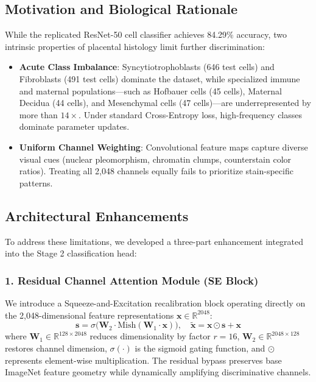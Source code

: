 \documentclass[a4paper,fleqn]{cas-sc}
\begin{document}
\subsection{Motivation and Biological Rationale}
While the replicated ResNet-50 cell classifier achieves 84.29\% accuracy, two intrinsic properties of placental histology limit further discrimination:
\begin{itemize}
    \item \textbf{Acute Class Imbalance}: Syncytiotrophoblasts (646 test cells) and Fibroblasts (491 test cells) dominate the dataset, while specialized immune and maternal populations—such as Hofbauer cells (45 cells), Maternal Decidua (44 cells), and Mesenchymal cells (47 cells)—are underrepresented by more than $14\times$. Under standard Cross-Entropy loss, high-frequency classes dominate parameter updates.
    \item \textbf{Uniform Channel Weighting}: Convolutional feature maps capture diverse visual cues (nuclear pleomorphism, chromatin clumps, counterstain color ratios). Treating all 2,048 channels equally fails to prioritize stain-specific patterns.
\end{itemize}

\subsection{Architectural Enhancements}
To address these limitations, we developed a three-part enhancement integrated into the Stage 2 classification head:

\subsubsection{1. Residual Channel Attention Module (SE Block)}
We introduce a Squeeze-and-Excitation \cite{hu2018squeeze} recalibration block operating directly on the 2,048-dimensional feature representations $\mathbf{x} \in \mathbb{R}^{2048}$:
\begin{equation}
    \mathbf{s} = \sigma\Big(\mathbf{W}_2 \cdot \text{Mish}(\mathbf{W}_1 \cdot \mathbf{x})\Big), \quad \mathbf{\tilde{x}} = \mathbf{x} \odot \mathbf{s} + \mathbf{x}
\end{equation}
where $\mathbf{W}_1 \in \mathbb{R}^{128 \times 2048}$ reduces dimensionality by factor $r=16$, $\mathbf{W}_2 \in \mathbb{R}^{2048 \times 128}$ restores channel dimension, $\sigma(\cdot)$ is the sigmoid gating function, and $\odot$ represents element-wise multiplication. The residual bypass preserves base ImageNet feature geometry while dynamically amplifying discriminative channels.
\end{document}
